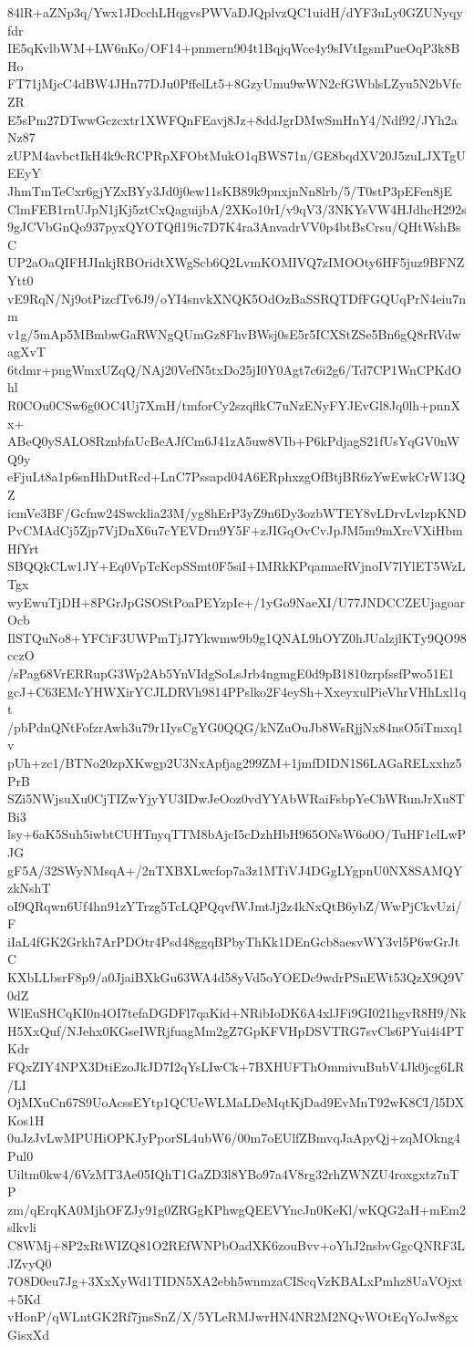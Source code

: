 84lR+aZNp3q/Ywx1JDcchLHqgvsPWVaDJQplvzQC1uidH/dYF3uLy0GZUNyqyfdr
IE5qKvlbWM+LW6nKo/OF14+pnmern904t1BqjqWce4y9sIVtIgsmPueOqP3k8BHo
FT71jMjcC4dBW4JHn77DJu0PffelLt5+8GzyUmu9wWN2cfGWblsLZyu5N2bVfcZR
E5sPm27DTwwGczcxtr1XWFQnFEavj8Jz+8ddJgrDMwSmHnY4/Ndf92/JYh2aNz87
zUPM4avbctIkH4k9cRCPRpXFObtMukO1qBWS71n/GE8bqdXV20J5zuLJXTgUEEyY
JhmTmTeCxr6gjYZxBYy3Jd0j0ew11sKB89k9pnxjnNn8lrb/5/T0stP3pEFen8jE
ClmFEB1rnUJpN1jKj5ztCxQaguijbA/2XKo10rI/v9qV3/3NKYsVW4HJdhcH292s
9gJCVbGnQo937pyxQYOTQfl19ic7D7K4ra3AnvadrVV0p4btBsCrsu/QHtWshBsC
UP2aOaQIFHJInkjRBOridtXWgScb6Q2LvmKOMIVQ7zIMOOty6HF5juz9BFNZYtt0
vE9RqN/Nj9otPizcfTv6J9/oYI4snvkXNQK5OdOzBaSSRQTDfFGQUqPrN4eiu7nm
v1g/5mAp5MBmbwGaRWNgQUmGz8FhvBWsj0sE5r5ICXStZSe5Bn6gQ8rRVdwagXvT
6tdmr+pngWmxUZqQ/NAj20VefN5txDo25jI0Y0Agt7c6i2g6/Td7CP1WnCPKdOhl
R0COu0CSw6g0OC4Uj7XmH/tmforCy2szqflkC7uNzENyFYJEvGl8Jq0lh+pnnXx+
ABeQ0ySALO8RznbfaUcBeAJfCm6J41zA5uw8VIb+P6kPdjagS21fUsYqGV0nWQ9y
eFjuLt8a1p6snHhDutRcd+LnC7Pssapd04A6ERphxzgOfBtjBR6zYwEwkCrW13QZ
icmVe3BF/Gcfnw24Swcklia23M/yg8hErP3yZ9n6Dy3ozbWTEY8vLDrvLvlzpKND
PvCMAdCj5Zjp7VjDnX6u7cYEVDrn9Y5F+zJIGqOvCvJpJM5m9mXrcVXiHbmHfYrt
SBQQkCLw1JY+Eq0VpTcKcpSSmt0F5siI+IMRkKPqamaeRVjnoIV7lYlET5WzLTgx
wyEwuTjDH+8PGrJpGSOStPoaPEYzpIe+/1yGo9NaeXI/U77JNDCCZEUjagoarOcb
IlSTQuNo8+YFCiF3UWPmTjJ7Ykwmw9b9g1QNAL9hOYZ0hJUalzjlKTy9QO98cczO
/sPag68VrERRupG3Wp2Ab5YnVIdgSoLsJrb4ngmgE0d9pB1810zrpfssfPwo51E1
gcJ+C63EMcYHWXirYCJLDRVh9814PPslko2F4eySh+XxeyxulPieVhrVHhLxl1qt
/pbPdnQNtFofzrAwh3u79r1IysCgYG0QQG/kNZuOuJb8WsRjjNx84nsO5iTmxq1v
pUh+zc1/BTNo20zpXKwgp2U3NxApfjag299ZM+1jmfDIDN1S6LAGaRELxxhz5PrB
SZi5NWjsuXu0CjTIZwYjyYU3IDwJeOoz0vdYYAbWRaiFsbpYeChWRunJrXu8TBi3
lsy+6aK5Suh5iwbtCUHTnyqTTM8bAjcI5cDzhHbH965ONsW6o0O/TuHF1elLwPJG
gF5A/32SWyNMsqA+/2nTXBXLwcfop7a3z1MTiVJ4DGgLYgpnU0NX8SAMQYzkNshT
oI9QRqwn6Uf4hn91zYTrzg5TcLQPQqvfWJmtJj2z4kNxQtB6ybZ/WwPjCkvUzi/F
iIaL4fGK2Grkh7ArPDOtr4Psd48ggqBPbyThKk1DEnGcb8aesvWY3vl5P6wGrJtC
KXbLLbsrF8p9/a0JjaiBXkGu63WA4d58yVd5oYOEDc9wdrPSnEWt53QzX9Q9V0dZ
WlEuSHCqKI0n4OI7tefaDGDFl7qaKid+NRibIoDK6A4xlJFi9GI021hgvR8H9/Nk
H5XxQuf/NJehx0KGseIWRjfuagMm2gZ7GpKFVHpDSVTRG7svCls6PYui4i4PTKdr
FQxZIY4NPX3DtiEzoJkJD7I2qYsLIwCk+7BXHUFThOmmivuBubV4Jk0jcg6LR/LI
OjMXuCn67S9UoAcssEYtp1QCUeWLMaLDeMqtKjDad9EvMnT92wK8CI/l5DXKos1H
0uJzJvLwMPUHiOPKJyPporSL4ubW6/00m7oEUlfZBmvqJaApyQj+zqMOkng4Pul0
Uiltm0kw4/6VzMT3Ae05IQhT1GaZD3l8YBo97a4V8rg32rhZWNZU4roxgxtz7nTP
zm/qErqKA0MjhOFZJy91g0ZRGgKPhwgQEEVYncJn0KeKl/wKQG2aH+mEm2slkvli
C8WMj+8P2xRtWIZQ81O2REfWNPbOadXK6zouBvv+oYhJ2nsbvGgcQNRF3LJZvyQ0
7O8D0eu7Jg+3XxXyWd1TIDN5XA2ebh5wnmzaCIScqVzKBALxPmhz8UaVOjxt+5Kd
vHonP/qWLntGK2Rf7jnsSnZ/X/5YLeRMJwrHN4NR2M2NQvWOtEqYoJw8gxGisxXd
